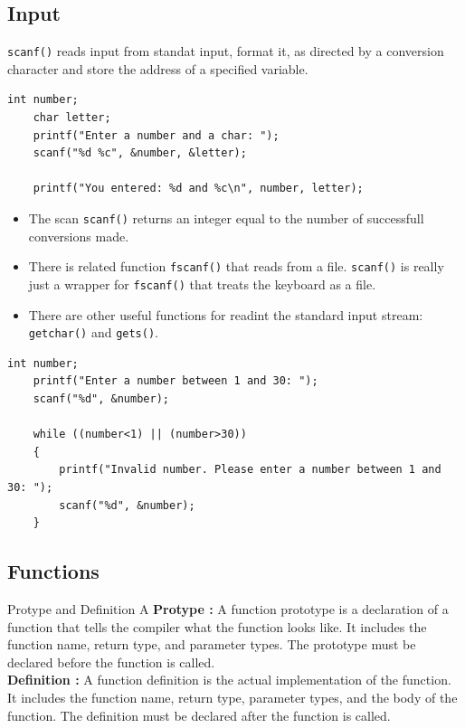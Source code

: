 \documentclass[a4paper, 10pt]{article}
\begin{document}
\subsection{Input}
\texttt{scanf()} reads input from standat input, format it, as directed by a conversion character and store the address of a specified variable.
\begin{lstlisting}[style=cStyle, caption={Reading an integer}]
    int number; 
    char letter; 
    printf("Enter a number and a char: ");
    scanf("%d %c", &number, &letter);

    printf("You entered: %d and %c\n", number, letter);
\end{lstlisting}
\begin{itemize}
    \item The scan \texttt{scanf()} returns an integer equal to the number of successfull conversions made.
    \item There is related function \texttt{fscanf()} that reads from a file. \texttt{scanf()} is really just a wrapper for \texttt{fscanf()} that treats the keyboard as a file.
    \item There are other useful functions for readint the standard input stream: \texttt{getchar()} and \texttt{gets()}.
\end{itemize}
\begin{lstlisting}[style=cStyle, caption={Check for no input}]
    int number;
    printf("Enter a number between 1 and 30: ");
    scanf("%d", &number);

    while ((number<1) || (number>30))
    {
        printf("Invalid number. Please enter a number between 1 and 30: ");
        scanf("%d", &number);
    }
\end{lstlisting}

\subsection{Functions}
\begin{definitionbox}{Protype and Definition}{}
    A \textbf{Protype :} A function prototype is a declaration of a function that tells the compiler what the function looks like. It includes the function name, return type, and parameter types. The prototype must be declared before the function is called. \\
    \textbf{Definition :} A function definition is the actual implementation of the function. It includes the function name, return type, parameter types, and the body of the function. The definition must be declared after the function is called.
\end{definitionbox}
\end{document}
